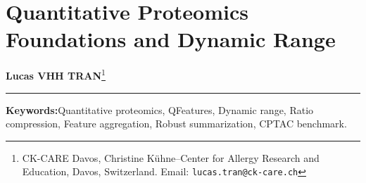\documentclass[11pt,twoside,openright]{book}
\begin{document}
\setcounter{chapter}{12}
\chapter{Quantitative Proteomics Foundations and Dynamic Range}
\label{chap:quant_proteomics}

\noindent
\textbf{Lucas VHH TRAN}\footnote{CK-CARE Davos, Christine K\"uhne--Center for Allergy Research and Education, Davos, Switzerland. Email: \texttt{lucas.tran@ck-care.ch}}\\
\rule{\textwidth}{0.8pt}

\begin{abstract}
\noindent
Quantitative proteomics infers protein abundances from digested peptide intensities, propagating filtering thresholds and missingness across hierarchical levels. Direct protein quantification is physically impossible in bottom-up mass spectrometry; peptides must be identified, quantified, and aggregated into protein groups. The choice of quantification methodology determines dynamic range, throughput, and ratio accuracy: label-free quantification (LFQ) spans four to five orders of dynamic range \cite{cox2014maxlfq}, whereas isobaric labeling (TMT) achieves multiplexed throughput at the cost of precursor co-isolation ratio compression \cite{ting2011sps, savitski2013tmt}. The \texttt{QFeatures} container formalizes this hierarchy as a directed acyclic graph linking peptide-spectrum matches (PSMs), peptides, and proteins \cite{gatto2023qfeatures, vanderaa2021scp} while preserving coordinate alignment and assay provenance \cite{huber2015orchestrating}. When summarizing peptide intensities into protein abundances, standard median aggregation is susceptible to outlying aberrant peptides, whereas M-estimation (\texttt{robustSummary}) downweights outlier residuals through Tukey biweight estimators \cite{stucki2022mscoreutils, ting2011msstats}. This chapter presents the mathematical foundations of MS quantitation, ratio compression kinetics, hierarchical \texttt{QFeatures} construction, median versus robust aggregation benchmarks on the CPTAC study \cite{paulovich2010cptac}, and linear modeling \cite{smyth2004limma} in R 4.6.1.
\end{abstract}

\vspace{1em}
\noindent\textbf{Keywords:}\enspace Quantitative proteomics, QFeatures, Dynamic range, Ratio compression, Feature aggregation, Robust summarization, CPTAC benchmark.
\end{document}
